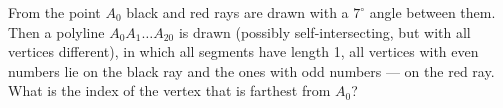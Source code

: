 \problem
From the point $A_0$ black and red rays are drawn with a $7^\circ$ angle between them.
Then a polyline $A_{0} A_{1} \ldots A_{20}$ is drawn (possibly self-intersecting, but with all vertices different), in which all segments have length 1, all vertices with even numbers lie on the black ray and the ones with odd numbers --- on the red ray.
What is the index of the vertex that is farthest from $A_0$?
\solution
\endproblem
